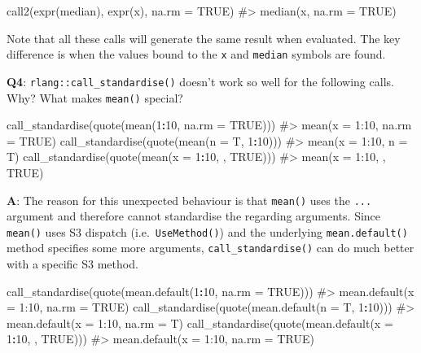 \documentclass[
]{krantz}
\makeatletter
\newenvironment{Shaded}{\begin{snugshade}}{\end{snugshade}}
\newcommand{\CommentTok}[1]{\textcolor[rgb]{0.56,0.35,0.01}{\textit{#1}}}
\newcommand{\DataTypeTok}[1]{\textcolor[rgb]{0.13,0.29,0.53}{#1}}
\newcommand{\DecValTok}[1]{\textcolor[rgb]{0.00,0.00,0.81}{#1}}
\newcommand{\KeywordTok}[1]{\textcolor[rgb]{0.13,0.29,0.53}{\textbf{#1}}}
\newcommand{\NormalTok}[1]{#1}
\newcommand{\OperatorTok}[1]{\textcolor[rgb]{0.81,0.36,0.00}{\textbf{#1}}}
\newcommand{\OtherTok}[1]{\textcolor[rgb]{0.56,0.35,0.01}{#1}}
\newenvironment{kframe}{%
\medskip{}
\setlength{\fboxsep}{.8em}
 \def\at@end@of@kframe{}%
 \ifinner\ifhmode%
  \def\at@end@of@kframe{\end{minipage}}%
  \begin{minipage}{\columnwidth}%
 \fi\fi%
 \def\FrameCommand##1{\hskip\@totalleftmargin \hskip-\fboxsep
 \colorbox{shadecolor}{##1}\hskip-\fboxsep
     \hskip-\linewidth \hskip-\@totalleftmargin \hskip\columnwidth}%
 \MakeFramed {\advance\hsize-\width
   \@totalleftmargin\z@ \linewidth\hsize
   \@setminipage}}%
 {\par\unskip\endMakeFramed%
 \at@end@of@kframe}
\renewenvironment{Shaded}{\begin{kframe}}{\end{kframe}}
\renewcommand{\KeywordTok} [1]{\textcolor[rgb]{0.00,0.44,0.13}{{#1}}}
\renewcommand{\DataTypeTok}[1]{\textcolor[rgb]{0.56,0.13,0.00}{{#1}}}
\renewcommand{\DecValTok}  [1]{\textcolor[rgb]{0.25,0.63,0.44}{{#1}}}
\renewcommand{\CommentTok} [1]{\textcolor[rgb]{0.38,0.63,0.69}{{#1}}}
\renewcommand{\OtherTok}   [1]{\textcolor[rgb]{0.00,0.44,0.13}{{#1}}}
\renewcommand{\NormalTok}  [1]{{#1}}
\makeatother
\begin{document}
\begin{Shaded}
\begin{Highlighting}[]
\KeywordTok{call2}\NormalTok{(}\KeywordTok{expr}\NormalTok{(median), }\KeywordTok{expr}\NormalTok{(x), }\DataTypeTok{na.rm =} \OtherTok{TRUE}\NormalTok{)}
\CommentTok{#> median(x, na.rm = TRUE)}
\end{Highlighting}
\end{Shaded}

Note that all these calls will generate the same result when evaluated. The key difference is when the values bound to the \texttt{x} and \texttt{median} symbols are found.

\textbf{{Q4}}: \texttt{rlang::call\_standardise()} doesn't work so well for the following calls.
Why? What makes \texttt{mean()} special?

\begin{Shaded}
\begin{Highlighting}[]
\KeywordTok{call_standardise}\NormalTok{(}\KeywordTok{quote}\NormalTok{(}\KeywordTok{mean}\NormalTok{(}\DecValTok{1}\OperatorTok{:}\DecValTok{10}\NormalTok{, }\DataTypeTok{na.rm =} \OtherTok{TRUE}\NormalTok{)))}
\CommentTok{#> mean(x = 1:10, na.rm = TRUE)}
\KeywordTok{call_standardise}\NormalTok{(}\KeywordTok{quote}\NormalTok{(}\KeywordTok{mean}\NormalTok{(}\DataTypeTok{n =}\NormalTok{ T, }\DecValTok{1}\OperatorTok{:}\DecValTok{10}\NormalTok{)))}
\CommentTok{#> mean(x = 1:10, n = T)}
\KeywordTok{call_standardise}\NormalTok{(}\KeywordTok{quote}\NormalTok{(}\KeywordTok{mean}\NormalTok{(}\DataTypeTok{x =} \DecValTok{1}\OperatorTok{:}\DecValTok{10}\NormalTok{, , }\OtherTok{TRUE}\NormalTok{)))}
\CommentTok{#> mean(x = 1:10, , TRUE)}
\end{Highlighting}
\end{Shaded}

\textbf{{A}}: The reason for this unexpected behaviour is that \texttt{mean()} uses the \texttt{...} argument and therefore cannot standardise the regarding arguments. Since \texttt{mean()} uses S3 dispatch (i.e.~\texttt{UseMethod()}) and the underlying \texttt{mean.default()} method specifies some more arguments, \texttt{call\_standardise()} can do much better with a specific S3 method.

\begin{Shaded}
\begin{Highlighting}[]
\KeywordTok{call_standardise}\NormalTok{(}\KeywordTok{quote}\NormalTok{(}\KeywordTok{mean.default}\NormalTok{(}\DecValTok{1}\OperatorTok{:}\DecValTok{10}\NormalTok{, }\DataTypeTok{na.rm =} \OtherTok{TRUE}\NormalTok{)))}
\CommentTok{#> mean.default(x = 1:10, na.rm = TRUE)}
\KeywordTok{call_standardise}\NormalTok{(}\KeywordTok{quote}\NormalTok{(}\KeywordTok{mean.default}\NormalTok{(}\DataTypeTok{n =}\NormalTok{ T, }\DecValTok{1}\OperatorTok{:}\DecValTok{10}\NormalTok{)))}
\CommentTok{#> mean.default(x = 1:10, na.rm = T)}
\KeywordTok{call_standardise}\NormalTok{(}\KeywordTok{quote}\NormalTok{(}\KeywordTok{mean.default}\NormalTok{(}\DataTypeTok{x =} \DecValTok{1}\OperatorTok{:}\DecValTok{10}\NormalTok{, , }\OtherTok{TRUE}\NormalTok{)))}
\CommentTok{#> mean.default(x = 1:10, na.rm = TRUE)}
\end{Highlighting}
\end{Shaded}
\end{document}
